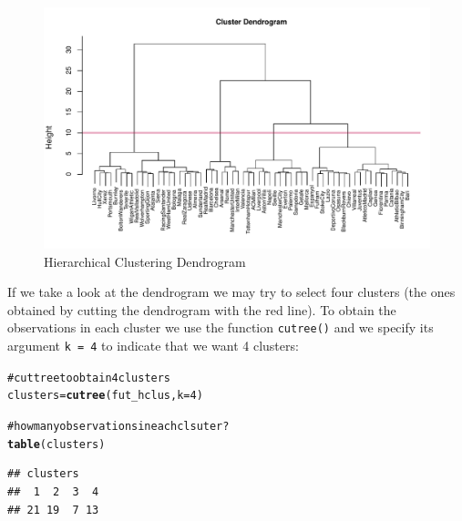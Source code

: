 \documentclass[12pt]{book}\usepackage{graphicx, color}
\makeatletter
\newcommand{\hlfunctioncall}[1]{\textcolor[rgb]{0.501960784313725,0,0.329411764705882}{\textbf{#1}}}%
\newcommand{\hlcomment}[1]{\textcolor[rgb]{0.180392156862745,0.6,0.341176470588235}{#1}}%
\newenvironment{kframe}{%
 \def\at@end@of@kframe{}%
 \ifinner\ifhmode%
  \def\at@end@of@kframe{\end{minipage}}%
  \begin{minipage}{\columnwidth}%
 \fi\fi%
 \def\FrameCommand##1{\hskip\@totalleftmargin \hskip-\fboxsep
 \colorbox{shadecolor}{##1}\hskip-\fboxsep
     \hskip-\linewidth \hskip-\@totalleftmargin \hskip\columnwidth}%
 \MakeFramed {\advance\hsize-\width
   \@totalleftmargin\z@ \linewidth\hsize
   \@setminipage}}%
 {\par\unskip\endMakeFramed%
 \at@end@of@kframe}
\newenvironment{knitrout}{}{} %
\newcommand{\code}[1]{\texttt{#1}}
\makeatother
\begin{document}
\begin{knitrout}
\color{fgcolor}\begin{figure}[h]


{\centering \includegraphics[width=0.95\linewidth,height=.65\linewidth]{figure/futbol_cluster_dendrogram} 

}

\caption[Hierarchical Clustering Dendrogram]{Hierarchical Clustering Dendrogram\label{fig:futbol_cluster_dendrogram}}
\end{figure}


\end{knitrout}


If we take a look at the dendrogram we may try to select four clusters (the ones obtained by cutting the dendrogram with the red line). To obtain the observations in each cluster we use the function \code{cutree()} and we specify its argument \code{k = 4} to indicate that we want 4 clusters:
\begin{knitrout}
\color{fgcolor}\begin{kframe}
\begin{alltt}
\hlcomment{# cut tree to obtain 4 clusters}
clusters = \hlfunctioncall{cutree}(fut_hclus, k = 4)

\hlcomment{# how many observations in each clsuter?}
\hlfunctioncall{table}(clusters)
\end{alltt}
\begin{verbatim}
## clusters
##  1  2  3  4 
## 21 19  7 13
\end{verbatim}
\end{kframe}
\end{knitrout}
\end{document}
